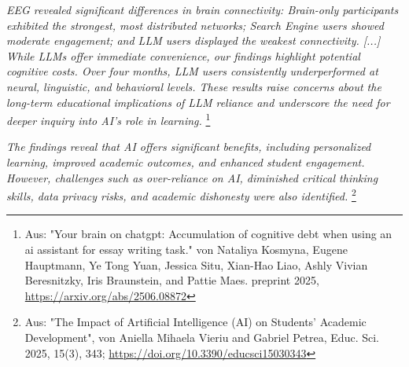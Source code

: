 \documentclass[paper=a4, fontsize=12pt]{scrartcl} %
\begin{document}

\emph{EEG revealed significant differences in brain connectivity: Brain-only participants exhibited the strongest, most distributed networks; Search Engine users showed moderate engagement; and LLM users displayed the weakest connectivity. [...] %
	While LLMs offer immediate convenience, our findings highlight potential cognitive costs. Over four months, LLM users consistently underperformed at neural, linguistic, and behavioral levels. These results raise concerns about the long-term educational implications of LLM reliance and underscore the need for deeper inquiry into AI's role in learning. }\footnote{Aus: "Your brain on chatgpt: Accumulation of cognitive debt when using an ai assistant for essay writing task." von Nataliya Kosmyna, Eugene Hauptmann, Ye Tong Yuan, Jessica Situ, Xian-Hao Liao, Ashly Vivian Beresnitzky, Iris Braunstein, and Pattie Maes. preprint 2025, \url{https://arxiv.org/abs/2506.08872}}

\bigskip

\emph{The findings reveal that AI offers significant benefits, including personalized learning, improved academic outcomes, and enhanced student engagement. However, challenges such as over-reliance on AI, diminished critical thinking skills, data privacy risks, and academic dishonesty were also identified.} %
\footnote{Aus: "The Impact of Artificial Intelligence (AI) on Students’ Academic Development",  von Aniella Mihaela Vieriu and Gabriel Petrea, Educ. Sci. 2025, 15(3), 343; \url{https://doi.org/10.3390/educsci15030343}}
\end{document}

